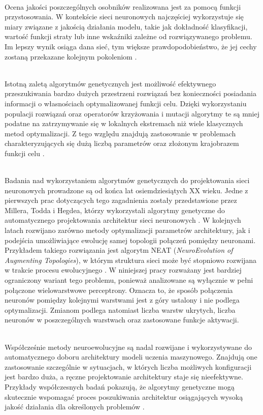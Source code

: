 \noindent\\
Ocena jakości poszczególnych osobników
realizowana jest za pomocą funkcji przystosowania.
W kontekście sieci neuronowych
najczęściej wykorzystuje się miary związane
z jakością działania modelu,
takie jak dokładność klasyfikacji,
wartość funkcji straty
lub inne wskaźniki zależne od rozwiązywanego problemu.
Im lepszy wynik osiąga dana sieć,
tym większe prawdopodobieństwo,
że jej cechy zostaną przekazane kolejnym pokoleniom%
%
%
.

\noindent\\
Istotną zaletą algorytmów genetycznych
jest możliwość efektywnego przeszukiwania
bardzo dużych przestrzeni rozwiązań
bez konieczności posiadania informacji
o własnościach optymalizowanej funkcji celu.
Dzięki wykorzystaniu populacji rozwiązań
oraz operatorów krzyżowania i mutacji
algorytmy te są mniej podatne na zatrzymywanie się
w lokalnych ekstremach niż wiele
klasycznych metod optymalizacji.
Z tego względu znajdują zastosowanie
w problemach charakteryzujących się
dużą liczbą parametrów
oraz złożonym krajobrazem funkcji celu%
%
.

\noindent\\
Badania nad wykorzystaniem algorytmów genetycznych
do projektowania sieci neuronowych prowadzone są
od końca lat osiemdziesiątych XX wieku.
Jedne z pierwszych prac dotyczących tego zagadnienia
zostały przedstawione przez Millera, Todda i Hegde{\textquotesingle}a,
którzy wykorzystali algorytmy genetyczne
do automatycznego projektowania
architektur sieci neuronowych%
.
W kolejnych latach rozwijano zarówno metody
optymalizacji parametrów architektury,
jak i podejścia umożliwiające ewolucję
samej topologii połączeń pomiędzy neuronami.
Przykładem takiego rozwiązania jest algorytm NEAT
(\textit{NeuroEvolution of Augmenting Topologies}),
w którym struktura sieci może być stopniowo rozwijana
w trakcie procesu ewolucyjnego%
.
W niniejszej pracy rozważany jest bardziej ograniczony
wariant tego problemu, ponieważ analizowane są wyłącznie
w pełni połączone wielowarstwowe perceptrony.
Oznacza to, że sposób połączenia neuronów pomiędzy
kolejnymi warstwami jest z góry ustalony i nie podlega
optymalizacji. Zmianom podlega natomiast liczba warstw
ukrytych, liczba neuronów w poszczególnych warstwach
oraz zastosowane funkcje aktywacji.

\noindent\\
Współcześnie metody neuroewolucyjne są nadal rozwijane
i wykorzystywane do automatycznego doboru architektury
modeli uczenia maszynowego.
Znajdują one zastosowanie szczególnie w sytuacjach,
w których liczba możliwych
konfiguracji jest bardzo duża,
a ręczne projektowanie architektury
staje się nieefektywne.
Przykłady współczesnych badań pokazują,
że algorytmy genetyczne mogą skutecznie wspomagać
proces poszukiwania architektur
osiągających wysoką jakość działania
dla określonych problemów%
%
.

